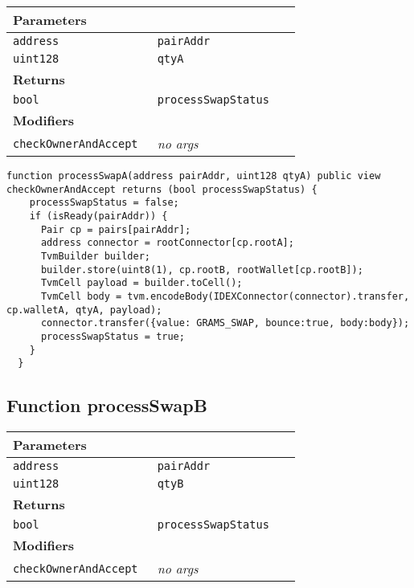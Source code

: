 \ifsoltables
\noindent\begin{tabular}{|l|l|p{5cm}|}\hline
\multicolumn{3}{|l|}{\bf Parameters}\\\hline
\tt address & \tt pairAddr &\\\hline
\tt uint128 & \tt qtyA &\\\hline
\multicolumn{3}{|l|}{\bf Returns}\\\hline
\tt bool & \tt processSwapStatus &\\\hline
\multicolumn{3}{|l|}{\bf Modifiers}\\\hline
\tt checkOwnerAndAccept & {\em no args} &\\\hline
\end{tabular}
\fi



\begin{lstlisting}[firstnumber=221]
  function processSwapA(address pairAddr, uint128 qtyA) public view checkOwnerAndAccept returns (bool processSwapStatus) {
    processSwapStatus = false;
    if (isReady(pairAddr)) {
      Pair cp = pairs[pairAddr];
      address connector = rootConnector[cp.rootA];
      TvmBuilder builder;
      builder.store(uint8(1), cp.rootB, rootWallet[cp.rootB]);
      TvmCell payload = builder.toCell();
      TvmCell body = tvm.encodeBody(IDEXConnector(connector).transfer, cp.walletA, qtyA, payload);
      connector.transfer({value: GRAMS_SWAP, bounce:true, body:body});
      processSwapStatus = true;
    }
  }
\end{lstlisting}

\subsection{Function processSwapB}


\ifsoltables
\noindent\begin{tabular}{|l|l|p{5cm}|}\hline
\multicolumn{3}{|l|}{\bf Parameters}\\\hline
\tt address & \tt pairAddr &\\\hline
\tt uint128 & \tt qtyB &\\\hline
\multicolumn{3}{|l|}{\bf Returns}\\\hline
\tt bool & \tt processSwapStatus &\\\hline
\multicolumn{3}{|l|}{\bf Modifiers}\\\hline
\tt checkOwnerAndAccept & {\em no args} &\\\hline
\end{tabular}
\fi



